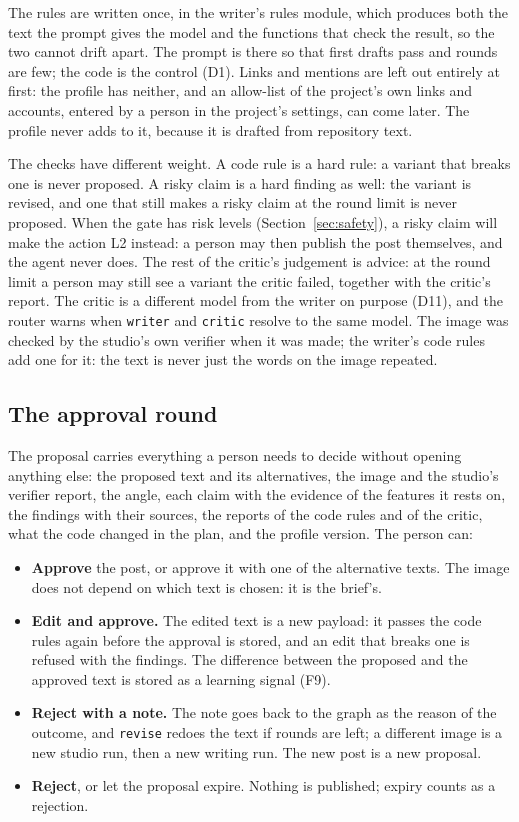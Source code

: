 \documentclass[11pt,a4paper]{article}
\begin{document}
The rules are written once, in the writer's rules module, which produces both the text the prompt gives the model and the functions that check the result, so the two cannot drift apart. The prompt is there so that first drafts pass and rounds are few; the code is the control (D1). Links and mentions are left out entirely at first: the profile has neither, and an allow-list of the project's own links and accounts, entered by a person in the project's settings, can come later. The profile never adds to it, because it is drafted from repository text.

The checks have different weight. A code rule is a hard rule: a variant that breaks one is never proposed. A risky claim is a hard finding as well: the variant is revised, and one that still makes a risky claim at the round limit is never proposed. When the gate has risk levels (Section~\ref{sec:safety}), a risky claim will make the action L2 instead: a person may then publish the post themselves, and the agent never does. The rest of the critic's judgement is advice: at the round limit a person may still see a variant the critic failed, together with the critic's report. The critic is a different model from the writer on purpose (D11), and the router warns when \texttt{writer} and \texttt{critic} resolve to the same model. The image was checked by the studio's own verifier when it was made; the writer's code rules add one for it: the text is never just the words on the image repeated.

\subsection{The approval round}
The proposal carries everything a person needs to decide without opening anything else: the proposed text and its alternatives, the image and the studio's verifier report, the angle, each claim with the evidence of the features it rests on, the findings with their sources, the reports of the code rules and of the critic, what the code changed in the plan, and the profile version. The person can:
\begin{itemize}
  \item \textbf{Approve} the post, or approve it with one of the alternative texts. The image does not depend on which text is chosen: it is the brief's.
  \item \textbf{Edit and approve.} The edited text is a new payload: it passes the code rules again before the approval is stored, and an edit that breaks one is refused with the findings. The difference between the proposed and the approved text is stored as a learning signal (F9).
  \item \textbf{Reject with a note.} The note goes back to the graph as the reason of the outcome, and \texttt{revise} redoes the text if rounds are left; a different image is a new studio run, then a new writing run. The new post is a new proposal.
  \item \textbf{Reject}, or let the proposal expire. Nothing is published; expiry counts as a rejection.
\end{itemize}
\end{document}

